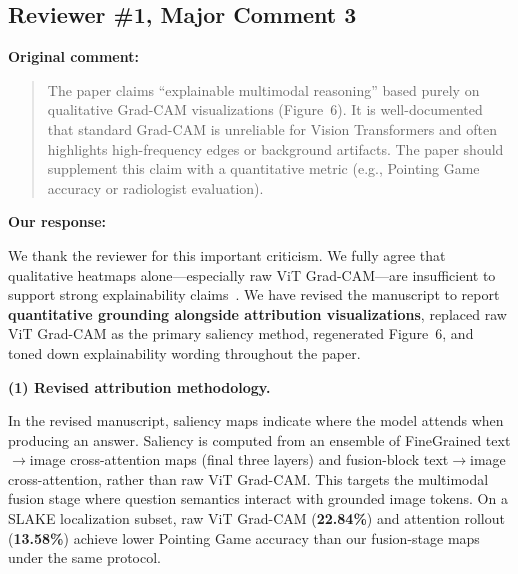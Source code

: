 %

\subsection*{Reviewer \#1, Major Comment 3}

\noindent\textbf{Original comment:}
\begin{quote}
\small
The paper claims ``explainable multimodal reasoning'' based purely on
qualitative Grad-CAM visualizations (Figure~6). It is well-documented that
standard Grad-CAM is unreliable for Vision Transformers and often highlights
high-frequency edges or background artifacts. The paper should supplement this
claim with a quantitative metric (e.g., Pointing Game accuracy or radiologist
evaluation).
\end{quote}

\noindent\textbf{Our response:}

We thank the reviewer for this important criticism. We fully agree that
qualitative heatmaps alone---especially raw ViT Grad-CAM---are insufficient to
support strong explainability claims~\cite{chefer2021transformer}. We have
revised the manuscript to report \textbf{quantitative grounding alongside
attribution visualizations}, replaced raw ViT Grad-CAM as the primary saliency
method, regenerated Figure~6, and toned down explainability wording throughout
the paper.

\medskip
\noindent\textbf{(1) Revised attribution methodology.}

In the revised manuscript, saliency maps indicate where the model attends when
producing an answer. Saliency is computed from an ensemble of FineGrained
text$\rightarrow$image cross-attention maps (final three layers) and
fusion-block text$\rightarrow$image cross-attention, rather than raw ViT
Grad-CAM. This targets the multimodal fusion stage where question semantics
interact with grounded image tokens. On a SLAKE localization subset, raw ViT
Grad-CAM (\textbf{22.84\%}) and attention rollout (\textbf{13.58\%}) achieve
lower Pointing Game accuracy than our fusion-stage maps under the same protocol.


